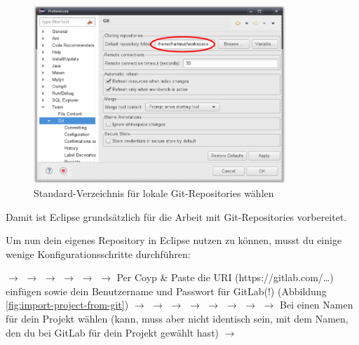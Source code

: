 \begin{figure}[h]
  \centering
  \includegraphics[width=0.85\textwidth]{./inf/SEKII/01_Vorbereitung/Eclipse-Git-Configuration-1.png}
  \caption{Standard-Verzeichnis für lokale Git-Repositories wählen}
  \label{fig:eclipse-git-configuration-1}
\end{figure}


\afterpage{\clearpage}

Damit ist Eclipse grundsätzlich für die Arbeit mit Git-Repositories vorbereitet.

Um nun dein eigenes Repository in Eclipse nutzen zu können, musst du einige
wenige Konfigurationsschritte durchführen:

 $\rightarrow$  $\rightarrow$ 
$\rightarrow$  $\rightarrow$  $\rightarrow$
 $\rightarrow$  Per Coyp \& Paste die URI
(https://gitlab.com/\ldots) einfügen sowie dein Benutzername und Passwort für
GitLab(!) (Abbildung \ref{fig:import-project-from-git}) $\rightarrow$
 $\rightarrow$  $\rightarrow$  $\rightarrow$
 $\rightarrow$  $\rightarrow$ 
$\rightarrow$   $\rightarrow$ Bei  einen Namen
für dein Projekt wählen (kann, muss aber nicht identisch sein, mit dem Namen,
den du bei GitLab für dein Projekt gewählt hast)  $\rightarrow$

